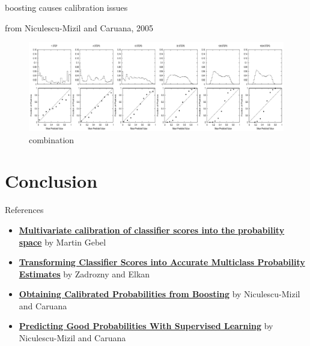 \documentclass[ignorenonframetext,]{beamer}
\begin{document}
\begin{frame}{boosting causes calibration issues}

\footnotesize
from Niculescu-Mizil and Caruana, 2005

\begin{figure}[htbp]
\centering
\includegraphics{./boosting.png}
\caption{combination}
\end{figure}

\end{frame}

\section{Conclusion}\label{conclusion}

\begin{frame}{References}

\begin{itemize}
\item
  \textbf{\href{https://www.researchgate.net/publication/28358301_Multivariate_calibration_of_classifier_scores_into_the_probability_space}{Multivariate
  calibration of classifier scores into the probability space}} by
  Martin Gebel
\item
  \textbf{\href{https://www.google.com/url?sa=t\&rct=j\&q=\&esrc=s\&source=web\&cd=4\&cad=rja\&uact=8\&ved=0ahUKEwit7-7h9f7UAhVl6IMKHUPeB2oQFghDMAM\&url=http\%3A\%2F\%2Fwww.cs.cornell.edu\%2Fcourses\%2Fcs678\%2F2007sp\%2FZadroznyElkan.pdf\&usg=AFQjCNEsN8dbe1yXCm7D7qkyrP6HZ6yOxg}{Transforming
  Classifier Scores into Accurate Multiclass Probability Estimates}} by
  Zadrozny and Elkan
\item
  \textbf{\href{http://www.cs.cornell.edu/~caruana/niculescu.scldbst.crc.rev4.pdf}{Obtaining
  Calibrated Probabilities from Boosting}} by Niculescu-Mizil and
  Caruana
\item
  \textbf{\href{https://www.google.com/url?url=http://scholar.google.com/scholar_url\%3Furl\%3Dhttp://machinelearning.wustl.edu/mlpapers/paper_files/icml2005_Niculescu-MizilC05.pdf\%26hl\%3Den\%26sa\%3DX\%26scisig\%3DAAGBfm1wOIFZHQSONJ4oLiHQyqALiSVCng\%26nossl\%3D1\%26oi\%3Dscholarr\&rct=j\&q=\&esrc=s\&sa=X\&ved=0ahUKEwiOotzS9v7UAhXr8YMKHZI8CGsQgAMIJygAMAA\&usg=AFQjCNG3rc7DzDTTox-DD_xm9hwrC5VVQA}{Predicting
  Good Probabilities With Supervised Learning}} by Niculescu-Mizil and
  Caruana
\end{itemize}

\end{frame}
\end{document}
